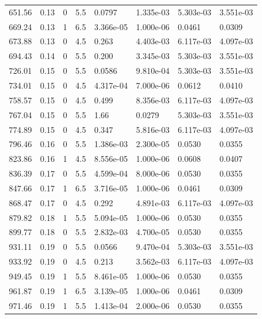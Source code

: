 \documentclass[preview]{standalone}
\begin{document}
{{{\begin{tabular}{L{1.2cm}C{1.2cm} C{0.3cm}C{0.5cm} C{1.4cm}C{1.4cm} C{1.4cm}C{1.4cm}}
  651.56  &  0.13  & 0     & 5.5 &  0.0797  & 1.335e-03  & 5.303e-03 &  3.551e-03   \\ 
  669.24  &  0.13  & 1     & 6.5 &  3.366e-05  & 1.000e-06  & 0.0461 &  0.0309   \\ 
  673.88  &  0.13  & 0     & 4.5 &  0.263  & 4.403e-03  & 6.117e-03 &  4.097e-03   \\ 
  694.43  &  0.14  & 0     & 5.5 &  0.200  & 3.345e-03  & 5.303e-03 &  3.551e-03   \\ 
  726.01  &  0.15  & 0     & 5.5 &  0.0586  & 9.810e-04  & 5.303e-03 &  3.551e-03   \\ 
  734.01  &  0.15  & 0     & 4.5 &  4.317e-04  & 7.000e-06  & 0.0612 &  0.0410   \\ 
  758.57  &  0.15  & 0     & 4.5 &  0.499  & 8.356e-03  & 6.117e-03 &  4.097e-03   \\ 
  767.04  &  0.15  & 0     & 5.5 &  1.66  & 0.0279  & 5.303e-03 &  3.551e-03   \\ 
  774.89  &  0.15  & 0     & 4.5 &  0.347  & 5.816e-03  & 6.117e-03 &  4.097e-03   \\ 
  796.46  &  0.16  & 0     & 5.5 &  1.386e-03  & 2.300e-05  & 0.0530 &  0.0355   \\ 
  823.86  &  0.16  & 1     & 4.5 &  8.556e-05  & 1.000e-06  & 0.0608 &  0.0407   \\ 
  836.39  &  0.17  & 0     & 5.5 &  4.599e-04  & 8.000e-06  & 0.0530 &  0.0355   \\ 
  847.66  &  0.17  & 1     & 6.5 &  3.716e-05  & 1.000e-06  & 0.0461 &  0.0309   \\ 
  868.47  &  0.17  & 0     & 4.5 &  0.292  & 4.891e-03  & 6.117e-03 &  4.097e-03   \\ 
  879.82  &  0.18  & 1     & 5.5 &  5.094e-05  & 1.000e-06  & 0.0530 &  0.0355   \\ 
  899.77  &  0.18  & 0     & 5.5 &  2.832e-03  & 4.700e-05  & 0.0530 &  0.0355   \\ 
  931.11  &  0.19  & 0     & 5.5 &  0.0566  & 9.470e-04  & 5.303e-03 &  3.551e-03   \\ 
  933.92  &  0.19  & 0     & 4.5 &  0.213  & 3.562e-03  & 6.117e-03 &  4.097e-03   \\ 
  949.45  &  0.19  & 1     & 5.5 &  8.461e-05  & 1.000e-06  & 0.0530 &  0.0355   \\ 
  961.87  &  0.19  & 1     & 6.5 &  3.139e-05  & 1.000e-06  & 0.0461 &  0.0309   \\ 
  971.46  &  0.19  & 1     & 5.5 &  1.413e-04  & 2.000e-06  & 0.0530 &  0.0355   \\ 

\end{tabular}}}}
\end{document}

